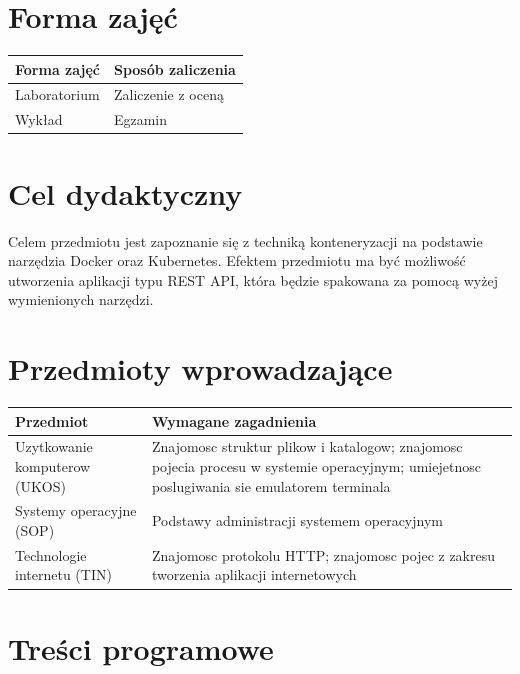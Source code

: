 \documentclass[12pt, a4paper]{article}
\begin{document}
\section{Forma zajęć}

\begin{tabular}{ll}
  \hline
  \textbf{Forma zajęć} & \textbf{Sposób zaliczenia} \\
  \hline
  Laboratorium & Zaliczenie z oceną \\
  Wykład & Egzamin \\
  \hline
\end{tabular}

\section{Cel dydaktyczny}

Celem przedmiotu jest zapoznanie się z techniką konteneryzacji na podstawie narzędzia Docker oraz Kubernetes. Efektem przedmiotu ma być możliwość utworzenia aplikacji typu REST API, która będzie spakowana za pomocą wyżej wymienionych narzędzi.

\section{Przedmioty wprowadzające}

\begin{tabularx}{\textwidth}{lX}
  \hline
  \textbf{Przedmiot} & \textbf{Wymagane zagadnienia} \\
  \hline
  Uzytkowanie komputerow (UKOS) & Znajomosc struktur plikow i katalogow; znajomosc pojecia procesu w systemie operacyjnym; umiejetnosc poslugiwania sie emulatorem terminala \\
  Systemy operacyjne (SOP) & Podstawy administracji systemem operacyjnym \\
  Technologie internetu (TIN) & Znajomosc protokolu HTTP; znajomosc pojec z zakresu tworzenia aplikacji internetowych \\
  \hline
\end{tabularx}

\section{Treści programowe}
\end{document}
